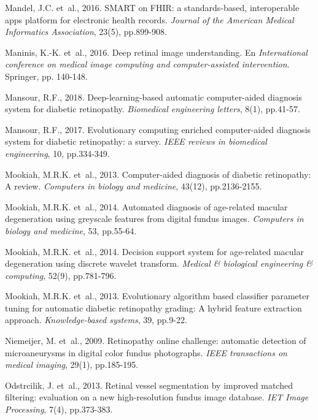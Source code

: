 \documentclass[
  12pt,
  spanish,
  a4paperpaper,
]{report}
\begin{document}
\leavevmode\hypertarget{ref-mandel2016smart}{}%
Mandel, J.C. et~al., 2016. SMART on FHIR: a standards-based,
interoperable apps platform for electronic health records. \emph{Journal
of the American Medical Informatics Association}, 23(5), pp.899-908.

\leavevmode\hypertarget{ref-maninis2016deep}{}%
Maninis, K.-K. et~al., 2016. Deep retinal image understanding. En
\emph{International conference on medical image computing and
computer-assisted intervention}. Springer, pp. 140-148.

\leavevmode\hypertarget{ref-mansour2018deep}{}%
Mansour, R.F., 2018. Deep-learning-based automatic computer-aided
diagnosis system for diabetic retinopathy. \emph{Biomedical engineering
letters}, 8(1), pp.41-57.

\leavevmode\hypertarget{ref-mansour2017evolutionary}{}%
Mansour, R.F., 2017. Evolutionary computing enriched computer-aided
diagnosis system for diabetic retinopathy: a survey. \emph{IEEE reviews
in biomedical engineering}, 10, pp.334-349.

\leavevmode\hypertarget{ref-mookiah2013computer}{}%
Mookiah, M.R.K. et~al., 2013. Computer-aided diagnosis of diabetic
retinopathy: A review. \emph{Computers in biology and medicine}, 43(12),
pp.2136-2155.

\leavevmode\hypertarget{ref-mookiah2014automated}{}%
Mookiah, M.R.K. et~al., 2014. Automated diagnosis of age-related macular
degeneration using greyscale features from digital fundus images.
\emph{Computers in biology and medicine}, 53, pp.55-64.

\leavevmode\hypertarget{ref-mookiah2014decision}{}%
Mookiah, M.R.K. et~al., 2014. Decision support system for age-related
macular degeneration using discrete wavelet transform. \emph{Medical \&
biological engineering \& computing}, 52(9), pp.781-796.

\leavevmode\hypertarget{ref-mookiah2013evolutionary}{}%
Mookiah, M.R.K. et~al., 2013. Evolutionary algorithm based classifier
parameter tuning for automatic diabetic retinopathy grading: A hybrid
feature extraction approach. \emph{Knowledge-based systems}, 39,
pp.9-22.

\leavevmode\hypertarget{ref-niemeijer2009retinopathy}{}%
Niemeijer, M. et~al., 2009. Retinopathy online challenge: automatic
detection of microaneurysms in digital color fundus photographs.
\emph{IEEE transactions on medical imaging}, 29(1), pp.185-195.

\leavevmode\hypertarget{ref-odstrcilik2013retinal}{}%
Odstrcilik, J. et~al., 2013. Retinal vessel segmentation by improved
matched filtering: evaluation on a new high-resolution fundus image
database. \emph{IET Image Processing}, 7(4), pp.373-383.
\end{document}
